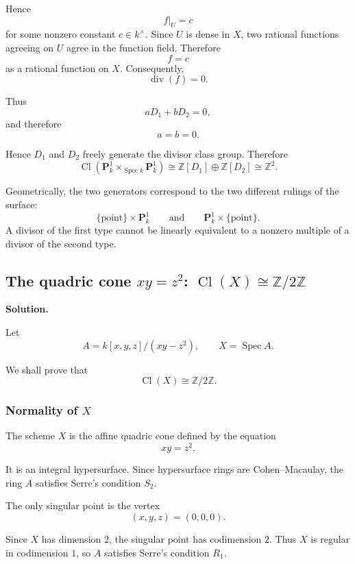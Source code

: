 Hence
\[
f|_U=c
\]
for some nonzero constant \(c\in k^\times\). Since \(U\) is dense in \(X\), two rational functions agreeing on \(U\) agree in the function field. Therefore
\[
f=c
\]
as a rational function on \(X\). Consequently,
\[
\operatorname{div}(f)=0.
\]

Thus
\[
aD_1+bD_2=0,
\]
and therefore
\[
a=b=0.
\]

Hence \(D_1\) and \(D_2\) freely generate the divisor class group. Therefore
\[
\boxed{
	\operatorname{Cl}\!\left(\mathbf{P}^1_k\times_{\operatorname{Spec} k}\mathbf{P}^1_k\right)
	\cong
	\mathbb{Z}[D_1]\oplus \mathbb{Z}[D_2]
	\cong
	\mathbb{Z}^2.
}
\]

\begin{remark}
	Geometrically, the two generators correspond to the two different rulings of the surface:
	\[
	\{\text{point}\}\times \mathbf{P}^1_k
	\qquad\text{and}\qquad
	\mathbf{P}^1_k\times\{\text{point}\}.
	\]
	A divisor of the first type cannot be linearly equivalent to a nonzero multiple of a divisor of the second type.
\end{remark}

\subsection{\texorpdfstring{The quadric cone \(xy=z^2\): \(\operatorname{Cl}(X)\cong \mathbb{Z}/2\mathbb{Z}\)}{The quadric cone xy=z2}}

\textbf{Solution.}

Let
\[
A=k[x,y,z]/(xy-z^2),
\qquad
X=\operatorname{Spec} A.
\]

We shall prove that
\[
\operatorname{Cl}(X)\cong \mathbb{Z}/2\mathbb{Z}.
\]

\subsubsection{Normality of \(X\)}

The scheme \(X\) is the affine quadric cone defined by the equation
\[
xy=z^2.
\]

It is an integral hypersurface. Since hypersurface rings are Cohen--Macaulay, the ring \(A\) satisfies Serre's condition \(S_2\).

The only singular point is the vertex
\[
(x,y,z)=(0,0,0).
\]

Since \(X\) has dimension \(2\), the singular point has codimension \(2\). Thus \(X\) is regular in codimension \(1\), so \(A\) satisfies Serre's condition \(R_1\).

